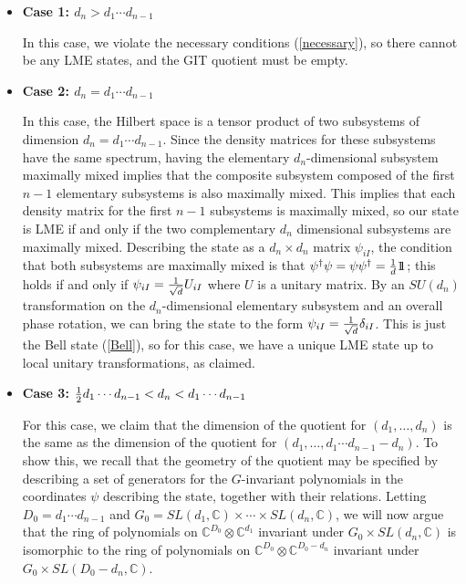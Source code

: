 \documentclass[12pt]{article}
\theoremstyle{definition}
\def\identity{{\rlap{1} \hskip 1.6pt \hbox{1}}}
\begin{document}
\begin{itemize}
\item
{\bf Case 1: $d_n > d_1 \cdots d_{n-1}$}

In this case, we violate the necessary conditions (\ref{necessary}), so there cannot be any LME states, and the GIT quotient must be empty.
\item
{\bf Case 2: $d_n = d_1 \cdots d_{n-1}$}

In this case, the Hilbert space is a tensor product of two subsystems of dimension $d_n = d_1 \cdots d_{n-1}$. Since the density matrices for these subsystems have the same spectrum, having the elementary $d_n$-dimensional subsystem maximally mixed implies that the composite subsystem composed of the first $n-1$ elementary subsystems is also maximally mixed. This implies that each density matrix for the first $n-1$ subsystems is maximally mixed, so our state is LME if and only if the two complementary $d_n$ dimensional subsystems are maximally mixed. Describing the state as a $d_n \times d_n$ matrix $\psi_{i I}$, the condition that both subsystems are maximally mixed is that $\psi^\dagger \psi = \psi \psi^\dagger = {1 \over d} \identity$; this holds if and only if $\psi_{i I} = {1 \over \sqrt{d}} U_{i I}$ where $U$ is a unitary matrix. By an $SU(d_n)$ transformation on the $d_n$-dimensional elementary subsystem and an overall phase rotation, we can bring the state to the form $\psi_{i I} = {1 \over \sqrt{d}} \delta_{i I}$. This is just the Bell state (\ref{Bell}), so for this case, we have a unique LME state up to local unitary transformations, as claimed.

\item
{\bf Case 3: ${1 \over 2} d_1 \cdots d_{n-1} < d_n <  d_1 \cdots d_{n-1}$}

For this case, we claim that the dimension of the quotient for $(d_1, \dots , d_n)$ is the same as the dimension of the quotient for $(d_1, \dots , d_1 \cdots d_{n-1} - d_n)$. To show this, we recall that the geometry of the quotient may be specified by describing a set of generators for the $G$-invariant polynomials in the coordinates $\psi$ describing the state, together with their relations. Letting $D_0 = d_1 \cdots d_{n-1}$ and $G_0 = SL(d_1, \mathbb{C}) \times \cdots \times SL(d_n, \mathbb{C})$, we will now argue that the ring of polynomials on $\mathbb{C}^{D_0}  \otimes \mathbb{C}^{d_1}$ invariant under $G_0 \times SL(d_n, \mathbb{C})$ is isomorphic to the ring of polynomials on $\mathbb{C}^{D_0}  \otimes \mathbb{C}^{{D_0} - d_n}$ invariant under $G_0 \times SL({D_0} - d_n, \mathbb{C})$.


\end{itemize}
\end{document}
